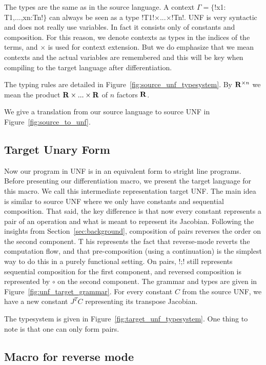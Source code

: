 The types are the same as in the source language. 
A context $\Gamma=\{$!x1: T1,...,xn:Tn!$\}$ can always be seen as a type !T1!$\times$...$\times$!Tn!.
UNF is very syntactic and does not really use variables. 
In fact it consists only of constants and composition. 
For this reason, we denote contexts as types in the indices of the terms, and $\times$ is used for context extension.
But we do emphasize that we mean contexts and the actual variables are remembered and
this will be key when compiling to the target language after differentiation. 

The typing rules are detailed in Figure~\ref{fig:source_unf_typesystem}.
By $\mathbf{R}^{\times n}$ we mean the product $\mathbf{R}\times...\times\mathbf{R}$ of $n$ factors $\mathbf{R}$.




We give a translation from our source language to source UNF in Figure~\ref{fig:source_to_unf}.




\subsection{Target Unary Form}

Now our program in UNF is in an equivalent form to stright line programs. 
Before presenting our differentiation macro, we present the target language for this macro. 
We call this intermediate representation target UNF.
The main idea is similar to source UNF where we only have constants and sequential composition.
That said, the key difference is that now every constant represents a pair of an operation and what is meant to represent its Jacobian.
Following the insights from Section~\ref{sec:background}, composition of pairs reverses the order on the second component. T
his represents the fact that reverse-mode reverts the computation flow, 
and that pre-composition (using a continuation) is the simplest way to do this in a purely functional setting.
On pairs, !;! still represents sequential composition for the first component, and reversed composition is represented by $\circ$ on the second component.
The grammar and types are given in Figure~\ref{fig:unf_target_grammar}.
For every constant $C$ from the source UNF, we have a new constant $J^TC$ representing its transpose Jacobian.



The typesystem is given in Figure~\ref{fig:target_unf_typesystem}. 
One thing to note is that one can only form pairs. 




\subsection{Macro for reverse mode}


